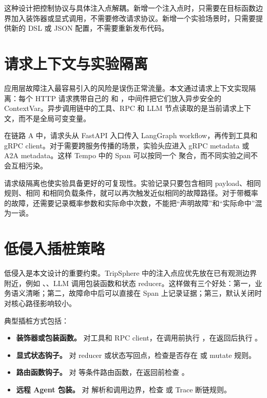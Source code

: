 这种设计把控制协议与具体注入点解耦。新增一个注入点时，只需要在目标函数边界加入装饰器或显式调用，不需要修改请求协议。新增一个实验场景时，只需要提供新的 DSL 或 JSON 配置，不需要重新发布代码。

\section{请求上下文与实验隔离}

应用层故障注入最容易引入的风险是误伤正常流量。本文通过请求上下文实现隔离：每个 HTTP 请求携带自己的  和 ，中间件把它们放入异步安全的 ContextVar。异步调用链中的工具、RPC 和 LLM 节点读取的是当前请求上下文，而不是全局可变变量。

在链路 A 中，请求头从 FastAPI 入口传入 LangGraph workflow，再传到工具和 gRPC client。对于需要跨服务传播的场景，实验头应进入 gRPC metadata 或 A2A metadata。这样 Tempo 中的 Span 可以按同一个  聚合，而不同实验之间不会互相污染。

请求级隔离也使实验具备更好的可复现性。实验记录只要包含相同 payload、相同  规则、相同  和相同负载条件，就可以再次触发近似相同的故障路径。对于带概率的故障，还需要记录概率参数和实际命中次数，不能把“声明故障”和“实际命中”混为一谈。

\section{低侵入插桩策略}

低侵入是本文设计的重要约束。TripSphere 中的注入点应优先放在已有观测边界附近，例如 、、LLM 调用包装函数和状态 reducer。这样做有三个好处：第一，业务语义清晰；第二，故障命中后可以直接在 Span 上记录证据；第三，默认关闭时对核心路径影响较小。

典型插桩方式包括：

\begin{itemize}
  \item \textbf{装饰器或包装函数。} 对工具和 RPC client，在调用前执行 ，在返回后执行 。
  \item \textbf{显式状态钩子。} 对 reducer 或状态写回点，检查是否存在  或 mutate 规则。
  \item \textbf{路由函数钩子。} 对  等条件路由函数，在返回前检查 。
  \item \textbf{远程 Agent 包装。} 对  解析和调用边界，检查  或 Trace 断链规则。
\end{itemize}

